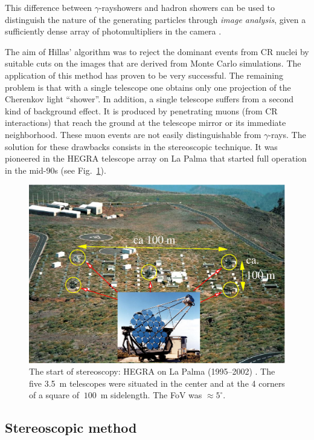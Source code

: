 \documentclass{svjour3x}                     %
\newcommand{\gr}{$\gamma$-ray}
\newcommand{\grs}{$\gamma$-rays}
\begin{document}
This difference between \gr showers and hadron showers can
be used to distinguish the nature of the generating particles through {\it
image analysis}, given a sufficiently dense array of photomultipliers in the
camera \cite{hillas85}.

The aim of Hillas' algorithm was to reject the dominant events from CR nuclei
by suitable cuts on the images that are derived from Monte Carlo
simulations. The application of this method has proven to be very
successful. The remaining problem is that with a single telescope one obtains
only one projection of the Cherenkov light ``shower''. In addition, a single
telescope suffers from a second kind of background effect. It is produced by
penetrating muons (from CR interactions) that reach the ground at the telescope
mirror or its immediate neighborhood. These muon events are not easily
distinguishable from \grs. The solution for these drawbacks consists in the
stereoscopic technique. It was pioneered in the HEGRA telescope array on La
Palma \cite{daum97} that started full operation in the mid-90s (see
Fig.~\ref{fig:8}).

\begin{figure}%
  \includegraphics[width=\textwidth]{HEGRA_layout_x.eps}
  \caption[HEGRA]{The start of stereoscopy: HEGRA on La Palma (1995--2002)
    \cite{hegrapic}. The five
    3.5~m telescopes were situated in the center and at the 4 corners of a
    square of $~100$~m sidelength. The FoV was $\approx 5^{\circ}$.}
\label{fig:8}       %
\end{figure}

\subsection {Stereoscopic method}
\end{document}
